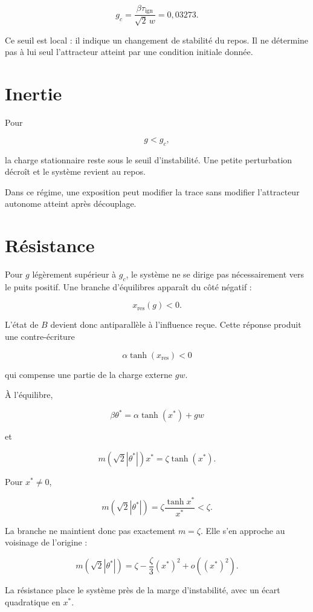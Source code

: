 \[
\boxed{
g_c
=
\frac{\beta\tau_{\mathrm{ign}}}{\sqrt2\,w}
=
0{,}03273
}.
\]

Ce seuil est local : il indique un changement de stabilité du repos. Il
ne détermine pas à lui seul l'attracteur atteint par une condition
initiale donnée.

\section{Inertie}\label{t2-inertie}

Pour

\[
g<g_c,
\]

la charge stationnaire reste sous le seuil d'instabilité. Une petite
perturbation décroît et le système revient au repos.

Dans ce régime, une exposition peut modifier la trace sans modifier
l'attracteur autonome atteint après découplage.

\section{Résistance}\label{t2-resistance}

Pour \(g\) légèrement supérieur à \(g_c\), le système ne se dirige pas
nécessairement vers le puits positif. Une branche d'équilibres apparaît
du côté négatif :

\[
x_{\mathrm{res}}(g)<0.
\]

L'état de \(B\) devient donc antiparallèle à l'influence reçue. Cette
réponse produit une contre-écriture

\[
\alpha\tanh(x_{\mathrm{res}})<0
\]

qui compense une partie de la charge externe \(gw\).

À l'équilibre,

\[
\beta\theta^\ast
=
\alpha\tanh(x^\ast)+gw
\]

et

\[
m(\sqrt2|\theta^\ast|)x^\ast
=
\zeta\tanh(x^\ast).
\]

Pour \(x^\ast\neq0\),

\[
m(\sqrt2|\theta^\ast|)
=
\zeta\frac{\tanh x^\ast}{x^\ast}
<\zeta.
\]

La branche ne maintient donc pas exactement \(m=\zeta\). Elle s'en
approche au voisinage de l'origine :

\[
m(\sqrt2|\theta^\ast|)
=
\zeta-\frac{\zeta}{3}(x^\ast)^2+o((x^\ast)^2).
\]

La résistance place le système près de la marge d'instabilité, avec un
écart quadratique en \(x^\ast\).

